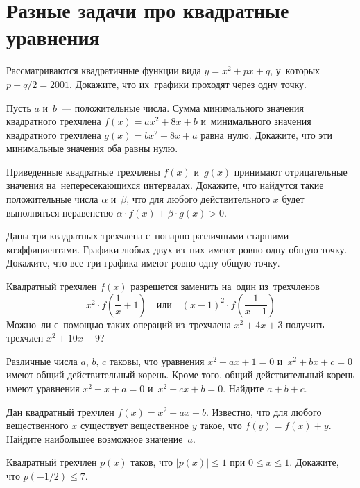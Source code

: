 
\section*{Разные задачи про квадратные уравнения}


\begin{problems}

\item
Рассматриваются квадратичные функции вида $y = x^2 + p x + q$, у~которых
$p + q / 2 = 2001$.
Докажите, что их~графики проходят через одну точку.

\item
Пусть $a$ и~$b$~--- положительные числа.
Сумма минимального значения квадратного трехчлена $f(x) = a x^2 + 8 x + b$
и~минимального значения квадратного трехчлена $g(x) = b x^2 + 8 x + a$ равна
нулю.
Докажите, что эти минимальные значения оба равны нулю.

\item
Приведенные квадратные трехчлены $f(x)$ и~$g(x)$ принимают отрицательные
значения на~непересекающихся интервалах.
Докажите, что найдутся такие положительные числа $\alpha$ и~$\beta$, что для
любого действительного $x$ будет выполняться неравенство
$\alpha \cdot f(x) + \beta \cdot g(x) > 0$.

\item
Даны три квадратных трехчлена с~попарно различными старшими коэффициентами.
Графики любых двух из~них имеют ровно одну общую точку.
Докажите, что все три графика имеют ровно одну общую точку.

\item
Квадратный трехчлен $f(x)$ разрешется заменить на~один из~трехчленов
\[
    x^2 \cdot f\left(\frac{1}{x} + 1 \right)
\quad\text{или}\quad
    (x - 1)^2 \cdot f\left(\frac{1}{x - 1} \right)
\]
Можно~ли с~помощью таких операций из~трехчлена $x^2 + 4 x + 3$ получить
трехчлен $x^2 + 10 x + 9$? 

\item
Различные числа $a$, $b$, $c$ таковы, что уравнения $x^2 + a x + 1 = 0$
и~$x^2 + b x + c = 0$ имеют общий действительный корень.
Кроме того, общий действительный корень имеют уравнения $x^2 + x + a = 0$
и~$x^2 + c x + b = 0$.
Найдите $a + b + c$.

\item
Дан квадратный трехчлен $f(x) = x^2 + a x + b$.
Известно, что для любого вещественного $x$ существует вещественное $y$ такое,
что $f(y) = f(x) + y$.
Найдите наибольшее возможное значение~$a$.

\item
Квадратный трехчлен $p(x)$ таков, что $|p(x)| \leq 1$ при $0 \leq x \leq 1$.
Докажите, что $p(- 1 / 2) \leq 7$.

\end{problems}

